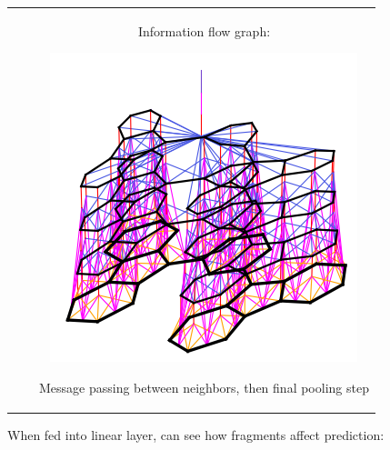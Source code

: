 \documentclass[landscape,a0b,final,a4resizeable]{include/a0poster}
\begin{document}
\begin{poster}
\begin{multicols}{3}
\begin{tabular}{ccc}
\begin{minipage}[c]{0.45\columnwidth}
\end{minipage}
& \qquad &
\begin{minipage}[c]{0.45\columnwidth}
\begin{center}
Information flow graph:
\centerline{\includegraphics[width=\columnwidth, clip, trim=0mm 0mm 4mm 4mm]{figures/3d-nets/net1.png}}
\end{center}

Message passing between neighbors, then final pooling step

\end{minipage}
\end{tabular}

\vspace{1.5in}


\newcommand{\mywidtha}{8cm}
\newcommand{\mywidthb}{10.3cm}

When fed into linear layer, can see how fragments affect prediction:


\end{multicols}
\end{poster}
\end{document}
